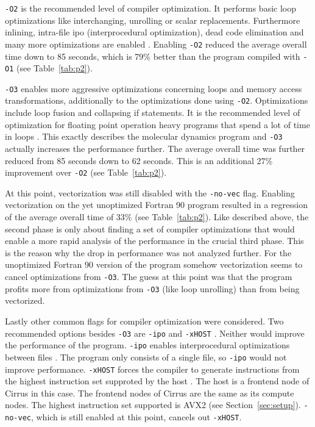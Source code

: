 \documentclass[twoside,11pt]{article}
\begin{document}
\texttt{-O2} is the recommended level of compiler optimization.
It performs basic loop optimizations like interchanging, unrolling or
scalar replacements.
Furthermore inlining, intra-file ipo (interprocedural optimization),
dead code elimination and many more optimizations are enabled
\citep[see][]{o}.
Enabling \texttt{-O2} reduced the average overall time down to
85 seconds, which is 79\% better than the program compiled with
\texttt{-O1} (see Table~\ref{tab:p2}).

\texttt{-O3} enables more aggressive optimizations concerning loops
and memory access transformations, additionally to the optimizations
done using \texttt{-O2}.
Optimizations include loop fusion and collapsing if statements.
It is the recommended level of optimization for floating point
operation heavy programs that spend a lot of time in loops
\citep{o}.
This exactly describes the molecular dynamics program and
\texttt{-O3} actually increases the performance further.
The average overall time was further reduced from 85 seconds down
to 62 seconds.
This is an additional 27\% improvement over \texttt{-O2}
(see Table~\ref{tab:p2}).

At this point, vectorization was still disabled with the
\texttt{-no-vec} flag.
Enabling vectorization on the yet unoptimized Fortran 90 program
resulted in a regression of the average overall time of 33\%
(see Table~\ref{tab:p2}).
Like described above, the second phase is only about finding a
set of compiler optimizations that would enable a more rapid analysis
of the performance in the crucial third phase.
This is the reason why the drop in performance was not analyzed
further.
For the unoptimized Fortran 90 version of the program somehow
vectorization seems to cancel optimizations from \texttt{-O3}.
The guess at this point was that the program profits more from
optimizations from \texttt{-O3} (like loop unrolling) than
from being vectorized.

Lastly other common flags for compiler optimization were considered.
Two recommended options besides \texttt{-O3} are \texttt{-ipo} and
\texttt{-xHOST} \citep{user389}.
Neither would improve the performance of the program.
\texttt{-ipo} enables interprocedural optimizations between files
\citep{ipo}.
The program only consists of a single file, so \texttt{-ipo} would
not improve performance.
\texttt{-xHOST} forces the compiler to generate instructions from the
highest instruction set supproted by the host \citep{xhost}.
The host is a frontend node of Cirrus in this case.
The frontend nodes of Cirrus are the same as its compute nodes.
The highest instruction set supported is AVX2
(see Section~\ref{sec:setup}).
\texttt{-no-vec}, which is still enabled at this point, cancels out
\texttt{-xHOST}.
\end{document}
